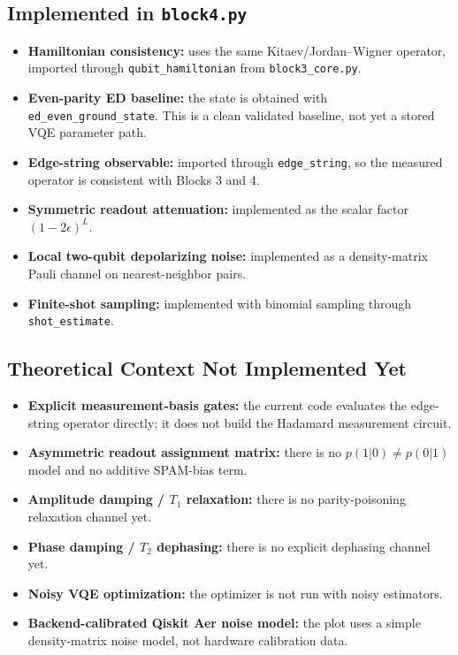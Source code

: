 \documentclass[11pt]{article}
\begin{document}
\subsection*{Implemented in \texttt{block4.py}}
\begin{itemize}
  \item \textbf{Hamiltonian consistency:} uses the same Kitaev/Jordan--Wigner operator, imported through \texttt{qubit\_hamiltonian} from \texttt{block3\_core.py}.
  \item \textbf{Even-parity ED baseline:} the state is obtained with \texttt{ed\_even\_ground\_state}. This is a clean validated baseline, not yet a stored VQE parameter path.
  \item \textbf{Edge-string observable:} imported through \texttt{edge\_string}, so the measured operator is consistent with Blocks 3 and 4.
  \item \textbf{Symmetric readout attenuation:} implemented as the scalar factor $(1-2\epsilon)^L$.
  \item \textbf{Local two-qubit depolarizing noise:} implemented as a density-matrix Pauli channel on nearest-neighbor pairs.
  \item \textbf{Finite-shot sampling:} implemented with binomial sampling through \texttt{shot\_estimate}.
\end{itemize}

\subsection*{Theoretical Context Not Implemented Yet}
\begin{itemize}
  \item \textbf{Explicit measurement-basis gates:} the current code evaluates the edge-string operator directly; it does not build the Hadamard measurement circuit.
  \item \textbf{Asymmetric readout assignment matrix:} there is no $p(1|0)\neq p(0|1)$ model and no additive SPAM-bias term.
  \item \textbf{Amplitude damping / $T_1$ relaxation:} there is no parity-poisoning relaxation channel yet.
  \item \textbf{Phase damping / $T_2$ dephasing:} there is no explicit dephasing channel yet.
  \item \textbf{Noisy VQE optimization:} the optimizer is not run with noisy estimators.
  \item \textbf{Backend-calibrated Qiskit Aer noise model:} the plot uses a simple density-matrix noise model, not hardware calibration data.
\end{itemize}
\end{document}
